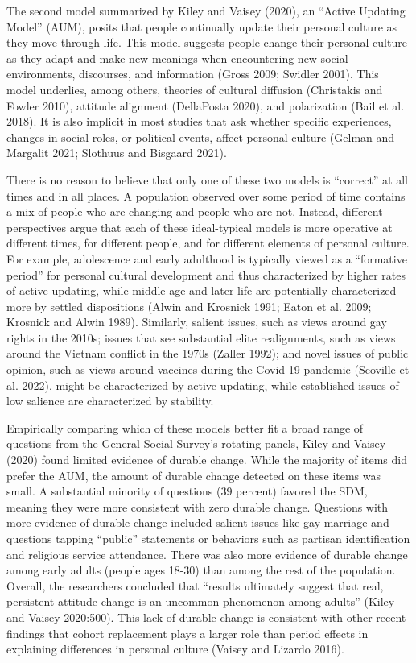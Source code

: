 \documentclass[
  11pt,
]{article}
\begin{document}
The second model summarized by Kiley and Vaisey (2020), an ``Active
Updating Model'' (AUM), posits that people continually update their
personal culture as they move through life. This model suggests people
change their personal culture as they adapt and make new meanings when
encountering new social environments, discourses, and information (Gross
2009; Swidler 2001). This model underlies, among others, theories of
cultural diffusion (Christakis and Fowler 2010), attitude alignment
(DellaPosta 2020), and polarization (Bail et al. 2018). It is also
implicit in most studies that ask whether specific experiences, changes
in social roles, or political events, affect personal culture (Gelman
and Margalit 2021; Slothuus and Bisgaard 2021).

There is no reason to believe that only one of these two models is
``correct'' at all times and in all places. A population observed over
some period of time contains a mix of people who are changing and people
who are not. Instead, different perspectives argue that each of these
ideal-typical models is more operative at different times, for different
people, and for different elements of personal culture. For example,
adolescence and early adulthood is typically viewed as a ``formative
period'' for personal cultural development and thus characterized by
higher rates of active updating, while middle age and later life are
potentially characterized more by settled dispositions (Alwin and
Krosnick 1991; Eaton et al. 2009; Krosnick and Alwin 1989). Similarly,
salient issues, such as views around gay rights in the 2010s; issues
that see substantial elite realignments, such as views around the
Vietnam conflict in the 1970s (Zaller 1992); and novel issues of public
opinion, such as views around vaccines during the Covid-19 pandemic
(Scoville et al. 2022), might be characterized by active updating, while
established issues of low salience are characterized by stability.

Empirically comparing which of these models better fit a broad range of
questions from the General Social Survey's rotating panels, Kiley and
Vaisey (2020) found limited evidence of durable change. While the
majority of items did prefer the AUM, the amount of durable change
detected on these items was small. A substantial minority of questions
(39 percent) favored the SDM, meaning they were more consistent with
zero durable change. Questions with more evidence of durable change
included salient issues like gay marriage and questions tapping
``public'' statements or behaviors such as partisan identification and
religious service attendance. There was also more evidence of durable
change among early adults (people ages 18-30) than among the rest of the
population. Overall, the researchers concluded that ``results ultimately
suggest that real, persistent attitude change is an uncommon phenomenon
among adults'' (Kiley and Vaisey 2020:500). This lack of durable change
is consistent with other recent findings that cohort replacement plays a
larger role than period effects in explaining differences in personal
culture (Vaisey and Lizardo 2016).
\end{document}
